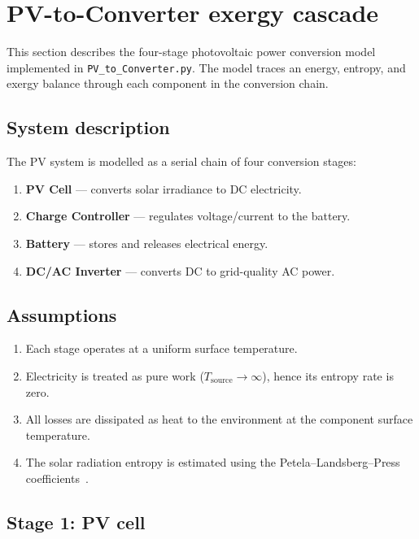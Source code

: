 \section{PV-to-Converter exergy cascade}
\label{sec:pv-converter}

This section describes the four-stage photovoltaic power conversion model implemented in \texttt{PV\_to\_Converter.py}. The model traces an energy, entropy, and exergy balance through each component in the conversion chain.

\subsection{System description}

The PV system is modelled as a serial chain of four conversion stages:
\begin{enumerate}
  \item \textbf{PV Cell} — converts solar irradiance to DC electricity.
  \item \textbf{Charge Controller} — regulates voltage/current to the battery.
  \item \textbf{Battery} — stores and releases electrical energy.
  \item \textbf{DC/AC Inverter} — converts DC to grid-quality AC power.
\end{enumerate}

\subsection{Assumptions}
\label{sec:pv-assumptions}

\begin{enumerate}
  \item Each stage operates at a uniform surface temperature.
  \item Electricity is treated as pure work ($T_\text{source} \to \infty$), hence its entropy rate is zero.
  \item All losses are dissipated as heat to the environment at the component surface temperature.
  \item The solar radiation entropy is estimated using the Petela--Landsberg--Press coefficients~\cite{petela1964}.
\end{enumerate}

\subsection{Stage 1: PV cell}
\label{sec:pv-stage1}

